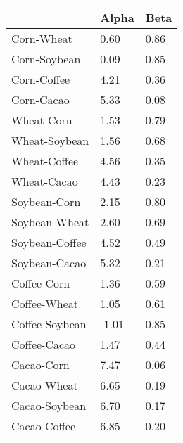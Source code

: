 \begin{tabular}{lll}
\toprule
{} &  Alpha &  Beta \\
\midrule
Corn-Wheat     &   0.60 &  0.86 \\
Corn-Soybean   &   0.09 &  0.85 \\
Corn-Coffee    &   4.21 &  0.36 \\
Corn-Cacao     &   5.33 &  0.08 \\
Wheat-Corn     &   1.53 &  0.79 \\
Wheat-Soybean  &   1.56 &  0.68 \\
Wheat-Coffee   &   4.56 &  0.35 \\
Wheat-Cacao    &   4.43 &  0.23 \\
Soybean-Corn   &   2.15 &  0.80 \\
Soybean-Wheat  &   2.60 &  0.69 \\
Soybean-Coffee &   4.52 &  0.49 \\
Soybean-Cacao  &   5.32 &  0.21 \\
Coffee-Corn    &   1.36 &  0.59 \\
Coffee-Wheat   &   1.05 &  0.61 \\
Coffee-Soybean &  -1.01 &  0.85 \\
Coffee-Cacao   &   1.47 &  0.44 \\
Cacao-Corn     &   7.47 &  0.06 \\
Cacao-Wheat    &   6.65 &  0.19 \\
Cacao-Soybean  &   6.70 &  0.17 \\
Cacao-Coffee   &   6.85 &  0.20 \\
\bottomrule
\end{tabular}
